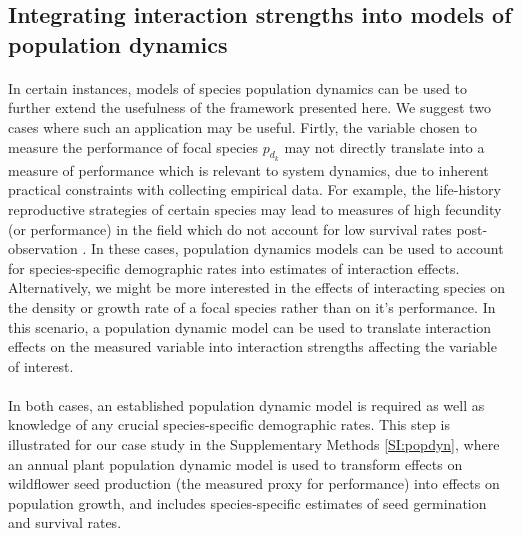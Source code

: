 \documentclass[a4,12pt]{article}
\begin{document}
    \subsection{Integrating interaction strengths into models of population dynamics}

        \paragraph{}
        In certain instances, models of species population dynamics can be used to further extend the usefulness of the framework presented here. We suggest two cases where such an application may be useful. Firtly, the variable chosen to measure the performance of focal species $p_{d_k}$ may not directly translate into a measure of performance which is relevant to system dynamics,  due to inherent practical constraints with collecting empirical data. For example, the life-history reproductive strategies of certain species may lead to measures of high fecundity (or performance) in the field which do not account for low survival rates post-observation \parencite{Broekman2020}. In these cases, population dynamics models can be used to account for species-specific demographic rates into estimates of interaction effects. Alternatively, we might be more interested in the effects of interacting species on the density or growth rate of a focal species rather than on it's performance. In this scenario, a population dynamic model can be used to translate interaction effects on the measured variable into interaction strengths affecting the variable of interest. 

        \paragraph{}
        In both cases, an established population dynamic model is required as well as knowledge of any crucial species-specific demographic rates. This step is illustrated for our case study in the Supplementary Methods \ref{SI:popdyn}, where an annual plant population dynamic model is used to transform effects on wildflower seed production (the measured proxy for performance) into effects on population growth, and includes species-specific estimates of seed germination and survival rates. 

\end{document}
